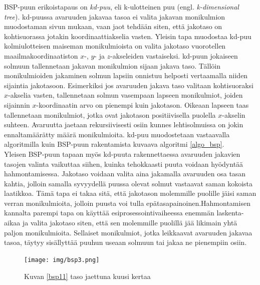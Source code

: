 ﻿\documentclass[a4paper, 12pt, titlepage]{article}
\begin{document}
BSP-puun erikoistapaus on \emph{kd-puu}, eli k-ulotteinen puu (engl. \emph{k-dimensional tree}). 
kd-puussa avaruuden jakavaa tasoa ei valita jakavan monikulmion muodostaman sivun mukaan, vaan jaot tehdään siten, että jakotaso on kohtisuorassa  jotakin koordinaattiakselia vasten. Yleisin tapa muodostaa kd-puu kolmiulotteisen maiseman monikulmioista on valita jakotaso vuorotellen maailmakoordinaatiston $x$-, $y$- ja $z$-akseleiden vastaiseksi. kd-puun jokaiseen solmuun tallennetaan  
jakavan monikulmion sijaan jakava taso. Tällöin monikulmioiden jakaminen solmun lapsiin onnistuu helposti vertaamalla niiden sijaintia jakotasoon. Esimerkiksi jos avaruuden jakava taso valitaan kohtisuoraksi $x$-akselia vasten, tallennetaan solmun vasempaan lapseen monikulmiot, joiden sijainnin $x$-koordinaatin arvo on pienempi kuin jakotason. Oikeaan lapseen taas tallennetaan monikulmiot, jotka ovat jakotason positiivisella puolella $x$-akselin suhteen. \citep[.]{samet} Avaruutta jaetaan rekursiivisesti osiin kunnes lehtisolmuissa on jokin ennaltamäärätty määrä monikulmioita. kd-puu muodostetaan vastaavalla algoritmilla kuin BSP-puun rakentamista kuvaava algoritmi \ref{algo_bsp}.\\

Yleisen BSP-puun tapaan myös kd-puuta rakennettaessa avaruuden jakavien tasojen valinta vaikuttaa siihen, kuinka tehokkaasti puuta voidaan hyödyntää hahmontamisessa. Jakotaso voidaan valita aina jakamalla avaruuden osa tasan kahtia, jolloin samalla syvyydellä puussa olevat solmut vastaavat saman kokoista laatikkoa. Tämä tapa ei takaa sitä, että jakotason molemmille puolille jäisi saman verran monikulmioita, jolloin puusta voi tulla epätasapainoinen.Hahmontamisen kannalta parempi tapa on käyttää esiprosessointivaiheessa enemmän laskenta-aikaa ja valita jakotaso siten, että sen molemmille puolillä jää likimain yhtä paljon monikulmioita. Sellaiset monikulmiot, jotka leikkaavat avaruuden jakavaa tasoa, täytyy sisällyttää puuhun useaan solmuun tai jakaa ne pienempiin osiin. \citep[.]{havran}\\

\begin{figure}
 \centering 
 \texttt{[image: img/bsp3.png]}
 \caption{Kuvan \ref{bsp11} taso jaettuna kuusi kertaa}
 \vspace{-0.5cm} 
 \label{bsp3}
\end{figure}
\end{document}
